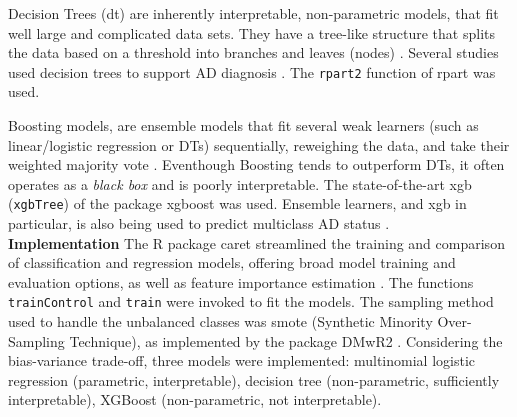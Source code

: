\documentclass{amsart}
\begin{document}
Decision Trees (\acrshort{dt}) are inherently interpretable, non-parametric models, that fit well large and complicated data sets. They have a tree-like structure that splits the data based on a threshold into branches and leaves (nodes) \cite{Song2015DecisionPrediction}. Several studies used decision trees to support AD diagnosis \cite{saputra2020detecting,dana2014using,kumar2017new,mofrad2019decision}. The \texttt{rpart2} \cite{rpart} function of \textsf{rpart} was used.

Boosting models, are ensemble models that fit several weak learners (such as linear/logistic regression or DTs) sequentially, reweighing the data, and take their weighted majority vote \cite{Friedman2000boosting,Friedman2001gbm}. Eventhough Boosting tends to outperform DTs, it often operates as a \textit{black box} and is poorly interpretable. The state-of-the-art \acrlong{xgb} (\texttt{xgbTree}) of the package \textsf{xgboost} \cite{Chen2016XGBoost:System} was used. Ensemble learners, and \acrshort{xgb} in particular, is also being used to predict multiclass AD status \cite{zhang2024multiclass,app13148298}.\\

\leavevmode\newline \textbf{Implementation}\hspace{.25cm} 
The R package \textsf{caret} streamlined the training and comparison of classification and regression models, offering broad model training and evaluation options, as well as feature importance estimation \cite{Kuhn2008BuildingPackage}. The functions \texttt{trainControl} and \texttt{train} were invoked to fit the models. The sampling method used to handle the unbalanced classes was \acrshort{smote} (Synthetic Minority Over-Sampling Technique), as implemented by the package \textsf{DMwR2} \cite{DMwR2}. Considering the bias-variance trade-off, three models were implemented: multinomial logistic regression (parametric, interpretable), decision tree (non-parametric, sufficiently interpretable), XGBoost (non-parametric, not interpretable).
\end{document}
